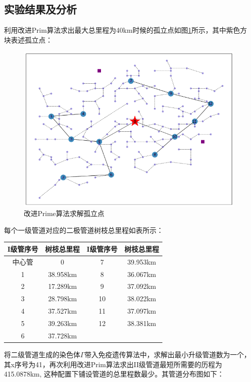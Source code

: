 \documentclass{whutmod}
\begin{document}
  	\subsection{实验结果及分析}
  	利用改进Prim算法求出最大总里程为40km时候的孤立点如图\ref{gld}所示，其中紫色方块表述孤立点：
  	 \begin{figure}[H]
  		\centering
  		\includegraphics[width=.65\textwidth]{figures/gld.png}
  		\caption{改进Prime算法求解孤立点}\label{gld}
  	\end{figure}
    每个一级管道对应的二极管道树枝总里程如表所示：
  \begin{table}[H]
  	\centering
  	\begin{tabular}{cccc}
  		\toprule[1.5pt]
  		\multicolumn{1}{m{3cm}}{\centering I级管序号} & \multicolumn{1}{m{3cm}}{\centering 树枝总里程} &
  		\multicolumn{1}{m{3cm}}{\centering I级管序号} &
  		\multicolumn{1}{m{3cm}}{\centering 树枝总里程} \\
  		\midrule[0.5pt]		
  		中心管 & 0 &7&39.953km \\ 
  		1  & 38.958km &8& 36.067km\\ 
  		2  & 17.289km &9&37.092km\\ 
  		3  & 28.798km &10& 38.022km\\ 
  		4 & 37.527km &11&37.097km \\ 
  		5  &39.263km &12& 38.381km\\ 
  		6  &37.728km &&\\ 
  		\bottomrule[1.5pt]
  	\end{tabular}
  \end{table}
  
  	将二级管道生成的染色体$\Gamma$带入免疫遗传算法中，求解出最小升级管道数为一个，其x序号为41，再次利用改进Prim算法求出II级管道最短所需要的历程为415.0878km, 这种配置下铺设管道的总里程数最少。其管道分布图如下：
  	
\end{document}
